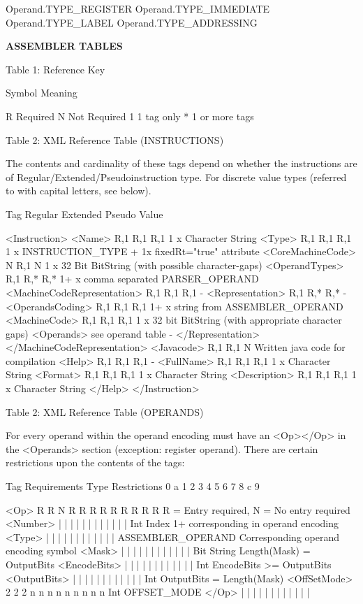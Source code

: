\documentclass[12pt]{report}
\begin{document}
\begin{enumerate}
Operand.TYPE_REGISTER
Operand.TYPE_IMMEDIATE
Operand.TYPE_LABEL
Operand.TYPE_ADDRESSING

\textbf{ASSEMBLER TABLES}

Table 1: Reference Key

Symbol	Meaning

R 		Required
N		Not Required
1		1 tag only
*		1 or more tags

Table 2: XML Reference Table (INSTRUCTIONS)

The contents and cardinality of these tags depend on whether the
instructions are of Regular/Extended/Pseudoinstruction type. For discrete
value types (referred to with capital letters, see below).

Tag					Regular		Extended	Pseudo		Value

<Instruction>
  <Name>				R,1		R,1		R,1		1 x Character String
  <Type>				R,1		R,1		R,1		1 x INSTRUCTION_TYPE + 1x fixedRt="true" attribute
  <CoreMachineCode>			N		R,1		N		1 x 32 Bit BitString (with possible character-gaps)
  <OperandTypes>			R,1		R,*		R,*		1+ x comma separated PARSER_OPERAND
  <MachineCodeRepresentation>		R,1		R,1		R,1		-
    <Representation>			R,1		R,*		R,*		-
      <OperandsCoding>			R,1		R,1		R,1		1+ x string from ASSEMBLER_OPERAND
  	<MachineCode>			R,1		R,1		R,1		1 x 32 bit BitString (with appropriate character gaps)
	<Operands>			see operand table				-
    </Representation>
  </MachineCodeRepresentation>
  <Javacode>				R,1		R,1		N		Written java code for compilation
  <Help>				R,1 		R,1		R,1		-
    <FullName>				R,1		R,1		R,1		1 x Character String
    <Format>				R,1		R,1		R,1		1 x Character String
    <Description>			R,1		R,1		R,1		1 x Character String
  </Help>
</Instruction>

Table 2: XML Reference Table (OPERANDS)

For every operand within the operand encoding must have an <Op></Op> in the
<Operands> section (exception: register operand). There are certain
restrictions upon the contents of the tags:

Tag				Requirements 			Type				Restrictions
				0 a 1 2 3 4 5 6 7 8 c 9

<Op>				R R N R R R R R R R R R		R = Entry required, N = No entry required
  <Number>			| | | | | | | | | | | |		Int				Index 1+ corresponding in operand encoding
  <Type>			| | | | | | | | | | | |		ASSEMBLER_OPERAND		Corresponding operand encoding symbol
  <Mask>			| | | | | | | | | | | |		Bit String 			Length(Mask) = OutputBits
  <EncodeBits>			| | | | | | | | | | | |		Int				EncodeBits >= OutputBits
  <OutputBits>			| | | | | | | | | | | |		Int				OutputBits = Length(Mask)
  <OffSetMode>			2 2 2 n n n n n n n n n		Int				OFFSET_MODE
</Op>				| | | | | | | | | | | |


\end{enumerate}
\end{document}
